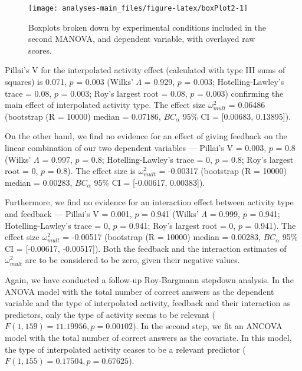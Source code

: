 \documentclass[11pt,]{article}
\begin{document}
\begin{figure*}[h]

{\centering \texttt{[image: analyses-main\_files/figure-latex/boxPlot2-1]} 

}

\caption{\label{box2} Boxplots broken down by experimental conditions included in the second MANOVA, and dependent variable, with overlayed raw scores.}\label{fig:boxPlot2}
\end{figure*}

Pillai's V for the interpolated activity effect (calculated with type
III sums of squares) is 0.071, \(p\) = 0.003 (Wilks' \(\Lambda\) =
0.929, \(p\) = 0.003; Hotelling-Lawley's trace = 0.08, \(p\) = 0.003;
Roy's largest root = 0.08, \(p\) = 0.003) confirming the main effect of
interpolated activity type. The effect size \(\omega^2_{mult}\) =
0.06486 (bootstrap (R = 10000) median = 0.07186, \(BC_\alpha\) 95\% CI =
{[}0.00683, 0.13895{]}).

On the other hand, we find no evidence for an effect of giving feedback
on the linear combination of our two dependent variables --- Pillai's V
= 0.003, \(p\) = 0.8 (Wilks' \(\Lambda\) = 0.997, \(p\) = 0.8;
Hotelling-Lawley's trace = 0, \(p\) = 0.8; Roy's largest root = 0, \(p\)
= 0.8). The effect size is \(\omega^2_{mult}\) = -0.00317 (bootstrap (R
= 10000) median = 0.00283, \(BC_\alpha\) 95\% CI = {[}-0.00617,
0.00383{]}).

Furthermore, we find no evidence for an interaction effect between
activity type and feedback --- Pillai's V = 0.001, \(p\) = 0.941 (Wilks'
\(\Lambda\) = 0.999, \(p\) = 0.941; Hotelling-Lawley's trace = 0, \(p\)
= 0.941; Roy's largest root = 0, \(p\) = 0.941). The effect size
\(\omega^2_{mult}\) = -0.00517 (bootstrap (R = 10000) median = 0.00283,
\(BC_\alpha\) 95\% CI = {[}-0.00617, -0.00517{]}). Both the feedback and
the interaction estimates of \(\omega^2_{mult}\) are to be considered to
be zero, given their negative values.

Again, we have conducted a follow-up Roy-Bargmann stepdown analysis. In
the ANOVA model with the total number of correct answers as the
dependent variable and the type of interpolated activity, feedback and
their interaction as predictors, only the type of activity seems to be
relevant (\(F(1, 159) = 11.19956, p = 0.00102\)). In the second step, we
fit an ANCOVA model with the total number of correct answers as the
covariate. In this model, the type of interpolated activity ceases to be
a relevant predictor (\(F(1, 155) = 0.17504, p = 0.67625\)).
\end{document}
